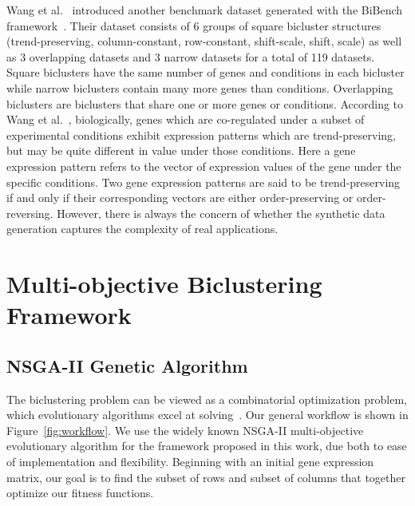 Wang et al.~\cite{wang2016unibic} introduced another benchmark dataset generated with the BiBench framework~\cite{eren2012comparative}.
Their dataset consists of 6 groups of square bicluster structures (trend-preserving, column-constant, row-constant, shift-scale, shift, scale) as well as 3 overlapping datasets and 3 narrow datasets for a total of 119 datasets.
Square biclusters have the same number of genes and conditions in each bicluster while narrow biclusters contain many more genes than conditions.
Overlapping biclusters are biclusters that share one or more genes or conditions. 
According to Wang et al.~\cite{wang2016unibic}, biologically, genes which are co-regulated under a subset of experimental conditions exhibit expression patterns which are trend-preserving, but may be quite different in value under those conditions.
Here a gene expression pattern refers to the vector of expression values of the gene under the specific conditions.
Two gene expression patterns are said to be trend-preserving if and only if their corresponding vectors are either order-preserving or order-reversing.
However, there is always the concern of whether the synthetic data generation captures the complexity of real applications. 


\section{Multi-objective Biclustering Framework}
\label{sec:framework}

\subsection{NSGA-II Genetic Algorithm}
The biclustering problem can be viewed as a combinatorial optimization problem, which evolutionary algorithms excel at solving~\cite{muhlenbein1988evolution}.
Our general workflow is shown in Figure~\ref{fig:workflow}. 
We use the widely known NSGA-II multi-objective evolutionary algorithm \cite{deb2002fast} for the framework proposed in this work, due both to ease of implementation and flexibility.
Beginning with an initial gene expression matrix, our goal is to find the subset of rows and subset of columns that together optimize our fitness functions.


